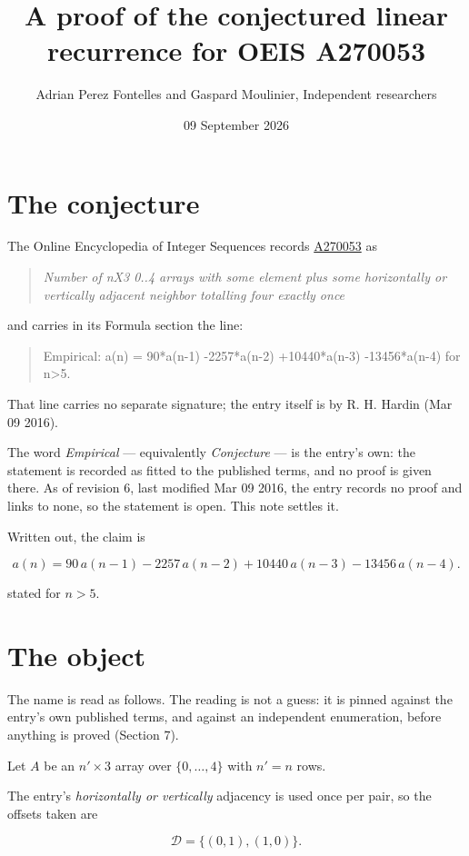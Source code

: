 \documentclass[11pt]{article}
\title{A proof of the conjectured linear recurrence for OEIS A270053}
\author{Adrian Perez Fontelles and Gaspard Moulinier, Independent researchers}
\date{09 September 2026}
\theoremstyle{definition}
\begin{document}
\maketitle
\section{The conjecture}

The Online Encyclopedia of Integer Sequences records \href{https://oeis.org/A270053}{A270053} as

\begin{quote}\itshape Number of nX3 0..4 arrays with some element plus some horizontally or vertically adjacent neighbor totalling four exactly once\end{quote}

and carries in its Formula section the line:

\begin{quote}\ttfamily Empirical: a(n) = 90*a(n-1) -2257*a(n-2) +10440*a(n-3) -13456*a(n-4) for n>5.\end{quote}

That line carries no separate signature; the entry itself is by R. H. Hardin (Mar 09 2016).

The word {\itshape Empirical} --- equivalently {\itshape Conjecture} --- is the entry's own: the statement is recorded as fitted to the published terms, and no proof is given there. As of revision 6, last modified Mar 09 2016, the entry records no proof and links to none, so the statement is open. This note settles it.

Written out, the claim is

\[a(n) = 90\,a(n-1) - 2257\,a(n-2) + 10440\,a(n-3) - 13456\,a(n-4).\]

stated for $n > 5$.

\section{The object}

The name is read as follows. The reading is not a guess: it is pinned against the entry's own published terms, and against an independent enumeration, before anything is proved (Section 7).

Let $A$ be an $n' \times 3$ array over $\{0,\dots,4\}$ with $n' = n$ rows.

The entry's {\itshape horizontally or vertically} adjacency is used once per pair, so the offsets taken are

\[\mathcal{D} = \{(0,1), (1,0)\}.\]
\end{document}
